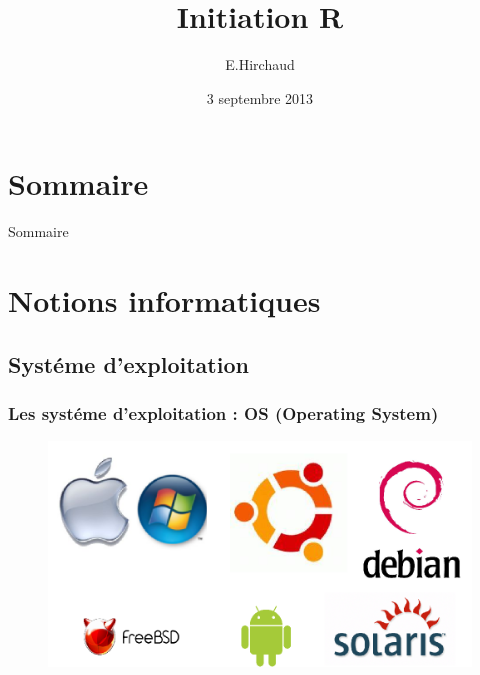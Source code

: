 \documentclass[table,svgnames,hyperref={pdfpagemode=FullScreen}]{beamer}
\title{Initiation R}
\institute{BiRD}
\date{3 septembre 2013}
\author{E.Hirchaud}
\begin{document}
\begin{frame}
	\titlepage
\end{frame}
	

\section*{Sommaire}
\begin{frame}{Sommaire}
	\small \tableofcontents
\end{frame}

\section{Notions informatiques}

\subsection{Systéme d'exploitation}
\begin{frame}
	\frametitle{Les systéme d'exploitation : OS (Operating System)}
	\begin{figure}
		\includegraphics[scale=0.55]{image/OSimage.png}
	\end{figure}
\end{frame}
\end{document}
